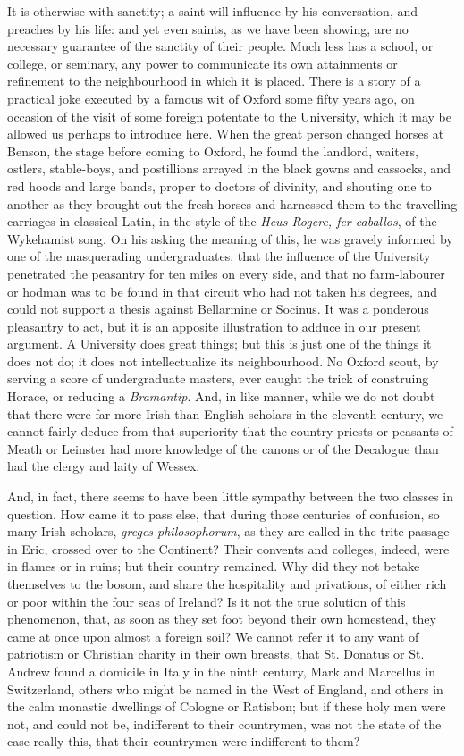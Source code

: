 It is otherwise with sanctity;
a saint will influence by his conversation, and preaches by his life:
and yet even saints, as we have been showing, are no necessary
guarantee of the sanctity of their people. Much less has a school, or
college, or seminary, any power to communicate its own attainments or
refinement to the neighbourhood in which it is placed. There is a
story of a practical joke executed by a famous wit of Oxford some
fifty years ago, on occasion of the visit of some foreign potentate to
the University, which it may be allowed us perhaps to introduce here.
When the great person changed horses at Benson, the stage before
coming to Oxford, he found the landlord, waiters, ostlers,
stable-boys, and postillions arrayed in the black gowns and cassocks,
and red hoods and large bands, proper to doctors of divinity, and
shouting one to another as they brought out the fresh horses and
harnessed them to the travelling carriages in classical Latin,
in the style of the \emph{Heus Rogere, fer caballos}, of the
Wykehamist song. On his asking the meaning of this, he was gravely
informed by one of the masquerading undergraduates, that the influence
of the University penetrated the peasantry for ten miles on every
side, and that no farm-labourer or hodman was to be found in that
circuit who had not taken his degrees, and could not support a thesis
against Bellarmine or Socinus. It was a ponderous pleasantry to act,
but it is an apposite illustration to adduce in our present argument.
A University does great things; but this is just one of the things it
does not do; it does not intellectualize its neighbourhood. No Oxford
scout, by serving a score of undergraduate masters, ever caught the
trick of construing Horace, or reducing a \emph{Bramantip}. And, in
like manner, while we do not doubt that there were far more Irish than
English scholars in the eleventh century, we cannot fairly deduce from
that superiority that the country priests or peasants of Meath or
Leinster had more knowledge of the canons or of the Decalogue than had
the clergy and laity of Wessex.

And, in fact, there seems to
have been little sympathy between the two classes in question. How
came it to pass else, that during those centuries of confusion, so
many Irish scholars, \emph{greges philosophorum}, as they are called
in the trite passage in Eric, crossed over to the Continent? Their
convents and colleges, indeed, were in flames or in ruins; but their
country remained. Why did they not betake themselves to the bosom, and
share the hospitality and privations, of either rich or poor within
the four seas of Ireland? Is it not the true solution of this
phenomenon, that, as soon as they set foot beyond their own homestead,
they came at once upon almost a foreign soil? We cannot refer it to
any want of patriotism or Christian charity in their own
breasts, that St. Donatus or St. Andrew found a domicile in Italy in
the ninth century, Mark and Marcellus in Switzerland, others who might
be named in the West of England, and others in the calm monastic
dwellings of Cologne or Ratisbon; but if these holy men were not, and
could not be, indifferent to their countrymen, was not the state of
the case really this, that their countrymen were indifferent to them?

